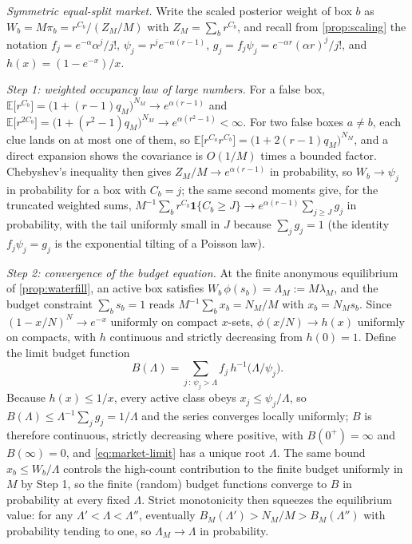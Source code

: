 \documentclass[11pt]{article}
\theoremstyle{definition}
\theoremstyle{remark}
\newcommand{\E}{\mathbb{E}}
\newcommand{\1}{\mathbf{1}}
\begin{document}
\emph{Symmetric equal-split market.} Write the scaled posterior weight of box $b$ as $W_b=M\pi_b=r^{C_b}/(Z_M/M)$ with $Z_M=\sum_b r^{C_b}$, and recall from \cref{prop:scaling} the notation $f_j=e^{-\alpha}\alpha^j/j!$, $\psi_j=r^je^{-\alpha(r-1)}$, $g_j=f_j\psi_j=e^{-\alpha r}(\alpha r)^j/j!$, and $h(x)=(1-e^{-x})/x$.

\emph{Step 1: weighted occupancy law of large numbers.} For a false box, $\E\bigl[r^{C_b}\bigr]=\bigl(1+(r-1)q_M\bigr)^{N_M}\to e^{\alpha(r-1)}$ and $\E\bigl[r^{2C_b}\bigr]=\bigl(1+(r^2-1)q_M\bigr)^{N_M}\to e^{\alpha(r^2-1)}<\infty$. For two false boxes $a\neq b$, each clue lands on at most one of them, so $\E\bigl[r^{C_a}r^{C_b}\bigr]=\bigl(1+2(r-1)q_M\bigr)^{N_M}$, and a direct expansion shows the covariance is $O(1/M)$ times a bounded factor. Chebyshev's inequality then gives $Z_M/M\to e^{\alpha(r-1)}$ in probability, so $W_b\to\psi_j$ in probability for a box with $C_b=j$; the same second moments give, for the truncated weighted sums, $M^{-1}\sum_b r^{C_b}\1\{C_b\ge J\}\to e^{\alpha(r-1)}\sum_{j\ge J}g_j$ in probability, with the tail uniformly small in $J$ because $\sum_j g_j=1$ (the identity $f_j\psi_j=g_j$ is the exponential tilting of a Poisson law).

\emph{Step 2: convergence of the budget equation.} At the finite anonymous equilibrium of \cref{prop:waterfill}, an active box satisfies $W_b\,\phi(s_b)=\Lambda_M:=M\lambda_M$, and the budget constraint $\sum_b s_b=1$ reads $M^{-1}\sum_b x_b=N_M/M$ with $x_b=N_Ms_b$. Since $(1-x/N)^N\to e^{-x}$ uniformly on compact $x$-sets, $\phi(x/N)\to h(x)$ uniformly on compacts, with $h$ continuous and strictly decreasing from $h(0)=1$. Define the limit budget function
\[
B(\Lambda)=\sum_{j\,:\,\psi_j>\Lambda} f_j\,h^{-1}\!\bigl(\Lambda/\psi_j\bigr).
\]
Because $h(x)\le 1/x$, every active class obeys $x_j\le\psi_j/\Lambda$, so $B(\Lambda)\le\Lambda^{-1}\sum_jg_j=1/\Lambda$ and the series converges locally uniformly; $B$ is therefore continuous, strictly decreasing where positive, with $B(0^+)=\infty$ and $B(\infty)=0$, and \cref{eq:market-limit} has a unique root $\Lambda$. The same bound $x_b\le W_b/\Lambda$ controls the high-count contribution to the finite budget uniformly in $M$ by Step 1, so the finite (random) budget functions converge to $B$ in probability at every fixed $\Lambda$. Strict monotonicity then squeezes the equilibrium value: for any $\Lambda'<\Lambda<\Lambda''$, eventually $B_M(\Lambda')>N_M/M>B_M(\Lambda'')$ with probability tending to one, so $\Lambda_M\to\Lambda$ in probability.
\end{document}
